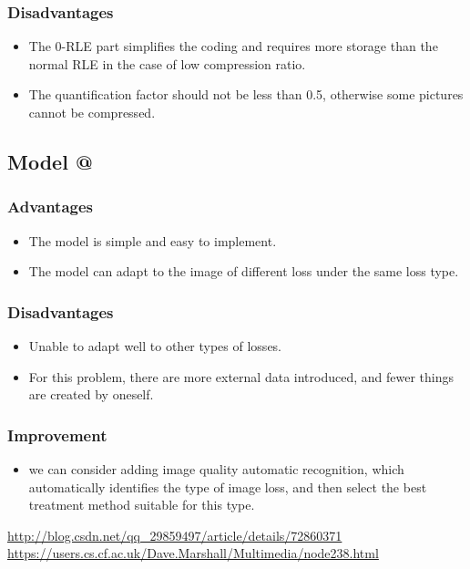 \documentclass{mcmthesis}
\makeatletter
\newcommand{\Rmnum}[1]{\expandafter\@slowromancap\romannumeral #1@}
\makeatother
\begin{document}
\subsubsection{Disadvantages}
\begin{itemize}
  \item The 0-RLE part simplifies the coding and requires more storage than the normal RLE in the case of low compression ratio.
  \item The quantification factor should not be less than 0.5, otherwise some pictures cannot be compressed.
\end{itemize}

\subsection{Model \Rmnum{2}}
\subsubsection{Advantages}
\begin{itemize}
  \item The model is simple and easy to implement.
  \item The model can adapt to the image of different loss under the same loss type.
\end{itemize}

\subsubsection{Disadvantages}
\begin{itemize}
  \item Unable to adapt well to other types of losses.
  \item For this problem, there are more external data introduced, and fewer things are created by oneself.
\end{itemize}

\subsubsection{Improvement}
\begin{itemize}
  \item we can consider adding image quality automatic recognition, which automatically identifies the type of image loss, and then select the best treatment method suitable for this type.
\end{itemize}

\begin{thebibliography}{99}
\url{http://blog.csdn.net/qq_29859497/article/details/72860371}
\url{https://users.cs.cf.ac.uk/Dave.Marshall/Multimedia/node238.html}
\end{thebibliography}
\end{document}
